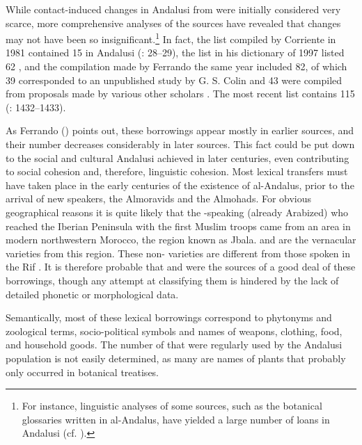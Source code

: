 \documentclass[output=paper,modfonts,nonflat]{langsci/langscibook}
\begin{document}
While contact-induced changes in Andalusi  from  were initially considered very scarce, more comprehensive analyses of the sources have revealed that changes may not have been so insignificant.\footnote{For instance, linguistic analyses of some sources, such as the botanical glossaries written in al-Andalus, have yielded a large number of  loans in Andalusi  (cf. \citealt{Abūl-Ḫayral-Išbīlī2004,Abūl-Ḫayral-Išbīlī2007,Corriente2012}).} In fact, the list compiled by Corriente in 1981 contained 15   in Andalusi  (\citeyear{Corriente1981}: 28–29), the list in his dictionary of 1997 listed 62 \citep[590]{Corriente1997dictionary}, and the compilation made by Ferrando the same year included 82, of which 39 corresponded to an unpublished study by G. S. Colin and 43 were compiled from proposals made by various other scholars \citep[133]{Ferrando1997}. The most recent list contains 115   (\citealt{CorrientePereiraVicente2017}: 1432–1433).

As Ferrando (\citeyear[140]{Ferrando1997}) points out, these borrowings appear mostly in earlier sources, and their number decreases considerably in later sources. This fact could be put down to the social and cultural  Andalusi  achieved in later centuries, even contributing to social cohesion and, therefore, linguistic cohesion. Most lexical transfers must have taken place in the early centuries of the existence of al-Andalus, prior to the arrival of new  speakers, the Almoravids and the Almohads. For obvious geographical reasons it is quite likely that the -speaking  (already Arabized) who reached the Iberian Peninsula with the first Muslim troops came from an area in modern northwestern Morocco, the region known as Jbala.  and  are the vernacular  varieties from this region. These non- varieties are different from those spoken in the Rif \citep{Kossmann2017}. It is therefore probable that  and   were the sources of a good deal of these borrowings, though any attempt at classifying them is hindered by the lack of detailed phonetic or morphological data. 

Semantically, most of these lexical borrowings correspond to phytonyms and zoological terms, socio-political symbols and names of weapons, clothing, food, and household goods. The number of   that were regularly used by the Andalusi population is not easily determined, as many are names of plants that probably only occurred in  botanical treatises. 
\end{document}
